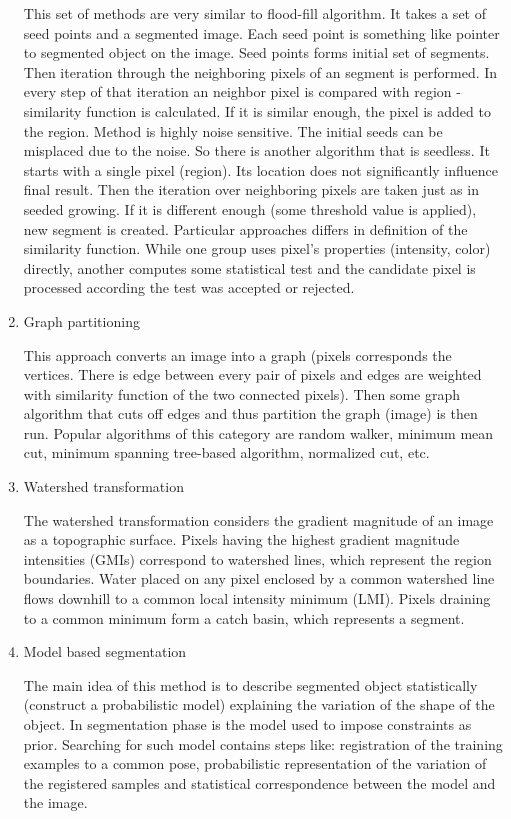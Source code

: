 \begin{enumerate}
  This set of methods are very similar to flood-fill algorithm.
It takes a set of seed points and a segmented image.
Each seed point is something like pointer to segmented object on the image.
Seed points forms initial set of segments.
Then iteration through the neighboring pixels of an segment is performed.
In every step of that iteration an neighbor pixel is compared with region - similarity function is calculated.
If it is similar enough, the pixel is added to the region.
  Method is highly noise sensitive.
The initial seeds can be misplaced due to the noise.
So there is another algorithm that is seedless.
It starts with a single pixel (region).
Its location does not significantly influence final result.
Then the iteration over neighboring pixels are taken just as in seeded growing.
If it is different enough (some threshold value is applied), new segment is created.
  Particular approaches differs in definition of the similarity function.
While one group uses pixel's properties (intensity, color) directly, another computes some statistical test and the candidate pixel is processed according the test was accepted or rejected.

  \item Graph partitioning

  This approach converts an image into a graph (pixels corresponds the vertices.
There is edge between every pair of pixels and edges are weighted with similarity function of the two connected pixels).
Then some graph algorithm that cuts off edges and thus partition the graph (image) is then run.
Popular algorithms of this category are random walker, minimum mean cut, minimum spanning tree-based algorithm, normalized cut, etc.

  \item Watershed transformation

  The watershed transformation considers the gradient magnitude of an image as a topographic surface.
Pixels having the highest gradient magnitude intensities (GMIs) correspond to watershed lines, which represent the region boundaries.
Water placed on any pixel enclosed by a common watershed line flows downhill to a common local intensity minimum (LMI).
Pixels draining to a common minimum form a catch basin, which represents a segment.

  \item Model based segmentation

  The main idea of this method is to describe segmented object statistically (construct a probabilistic model) explaining the variation of the shape of the object.
In segmentation phase is the model used to impose constraints as prior.
Searching for such model contains steps like: registration of the training examples to a common pose, probabilistic representation of the variation of the registered samples and statistical correspondence between the model and the image.


\end{enumerate}
